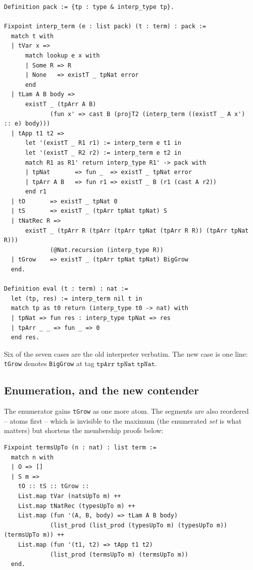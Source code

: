 \documentclass[11pt,a4paper]{article}
\theoremstyle{plain}
\theoremstyle{definition}
\theoremstyle{remark}
\begin{document}
\begin{lstlisting}
Definition pack := {tp : type & interp_type tp}.

Fixpoint interp_term (e : list pack) (t : term) : pack :=
  match t with
  | tVar x =>
      match lookup e x with
      | Some R => R
      | None   => existT _ tpNat error
      end
  | tLam A B body =>
      existT _ (tpArr A B)
             (fun x' => cast B (projT2 (interp_term ((existT _ A x') :: e) body)))
  | tApp t1 t2 =>
      let '(existT _ R1 r1) := interp_term e t1 in
      let '(existT _ R2 r2) := interp_term e t2 in
      match R1 as R1' return interp_type R1' -> pack with
      | tpNat       => fun _  => existT _ tpNat error
      | tpArr A B   => fun r1 => existT _ B (r1 (cast A r2))
      end r1
  | tO       => existT _ tpNat 0
  | tS       => existT _ (tpArr tpNat tpNat) S
  | tNatRec R =>
      existT _ (tpArr R (tpArr (tpArr tpNat (tpArr R R)) (tpArr tpNat R)))
             (@Nat.recursion (interp_type R))
  | tGrow    => existT _ (tpArr tpNat tpNat) BigGrow
  end.

Definition eval (t : term) : nat :=
  let (tp, res) := interp_term nil t in
  match tp as t0 return (interp_type t0 -> nat) with
  | tpNat => fun res : interp_type tpNat => res
  | tpArr _ _ => fun _ => 0
  end res.
\end{lstlisting}

Six of the seven cases are the old interpreter verbatim.  The new
case is one line: \texttt{tGrow} denotes \texttt{BigGrow} at tag
$\texttt{tpArr}\;\texttt{tpNat}\;\texttt{tpNat}$.

\subsection{Enumeration, and the new contender}

The enumerator gains \texttt{tGrow} as one more atom.  The segments
are also reordered -- atoms first -- which is invisible to the
maximum (the enumerated \emph{set} is what matters) but shortens the
membership proofs below:

\begin{lstlisting}
Fixpoint termsUpTo (n : nat) : list term :=
  match n with
  | O => []
  | S m =>
    tO :: tS :: tGrow ::
    List.map tVar (natsUpTo m) ++
    List.map tNatRec (typesUpTo m) ++
    List.map (fun '(A, B, body) => tLam A B body)
             (list_prod (list_prod (typesUpTo m) (typesUpTo m)) (termsUpTo m)) ++
    List.map (fun '(t1, t2) => tApp t1 t2)
             (list_prod (termsUpTo m) (termsUpTo m))
  end.
\end{lstlisting}
\end{document}
